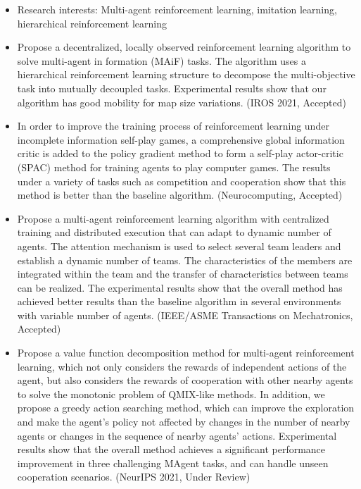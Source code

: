 
{\small
  \begin{itemize}
    \item Research interests: Multi-agent reinforcement learning, imitation learning, hierarchical reinforcement learning
    \item Propose a decentralized, locally observed reinforcement learning algorithm to solve multi-agent in formation (MAiF) tasks. The algorithm uses a hierarchical reinforcement learning structure to decompose the multi-objective task into mutually decoupled tasks. Experimental results show that our algorithm has good mobility for map size variations. (IROS 2021, Accepted)
    \item In order to improve the training process of reinforcement learning under incomplete information self-play games, a comprehensive global information critic is added to the policy gradient method to form a self-play actor-critic (SPAC) method for training agents to play computer games. The results under a variety of tasks such as competition and cooperation show that this method is better than the baseline algorithm. (Neurocomputing, Accepted)
    \item Propose a multi-agent reinforcement learning algorithm with centralized training and distributed execution that can adapt to dynamic number of agents. The attention mechanism is used to select several team leaders and establish a dynamic number of teams. The characteristics of the members are integrated within the team and the transfer of characteristics between teams can be realized. The experimental results show that the overall method has achieved better results than the baseline algorithm in several environments with variable number of agents. (IEEE/ASME Transactions on Mechatronics, Accepted)
    \item Propose a value function decomposition method for multi-agent reinforcement learning, which not only considers the rewards of independent actions of the agent, but also considers the rewards of cooperation with other nearby agents to solve the monotonic problem of QMIX-like methods. In addition, we propose a greedy action searching method, which can improve the exploration and make the agent's policy not affected by changes in the number of nearby agents or changes in the sequence of nearby agents' actions. Experimental results show that the overall method achieves a significant performance improvement in three challenging MAgent tasks, and can handle unseen cooperation scenarios. (NeurIPS 2021, Under Review)

\end{itemize}}
